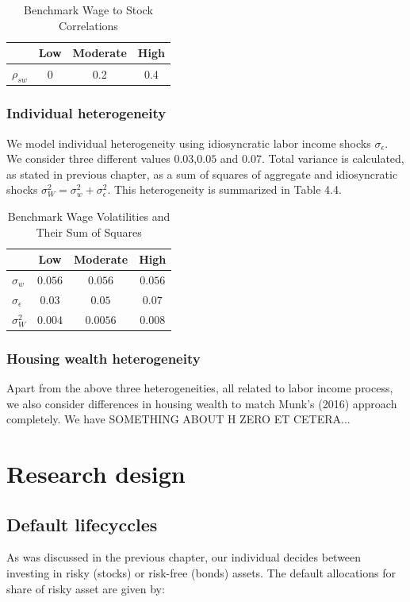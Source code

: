 \begin{table}
	\centering
	\caption{Benchmark Wage to Stock Correlations}
	\begin{tabular}[c]{c|ccc}
		&Low&Moderate&High\\
		\hline
		$\rho_{sw}$&0&0.2&0.4
	\end{tabular}
\end{table}


\subsubsection{Individual heterogeneity}

We model individual heterogeneity using idiosyncratic labor income shocks $\sigma_{\epsilon}$. We consider three different values $0.03$,$0.05$ and $0.07$. Total variance is calculated, as stated in previous chapter, as a sum of squares of aggregate and idiosyncratic shocks $\sigma^2_W = \sigma^2_w + \sigma^2_{\epsilon}$. This heterogeneity is summarized in Table 4.4. 


\begin{table}
	\centering
	\caption{Benchmark Wage Volatilities and Their Sum of Squares}
	\begin{tabular}[c]{l|ccc}
		&Low&Moderate&High\\
		\hline
		$\sigma_w$&$0.056$&$0.056$&$0.056$\\
		$\sigma_{\epsilon}$&$0.03$&$0.05$&$0.07$\\
		\hline
		$\sigma^2_{W}$&$0.004$&$0.0056$&$0.008$
	\end{tabular}
\end{table}


\subsubsection{Housing wealth heterogeneity}

Apart from the above three heterogeneities, all related to labor income process, we also consider differences in housing wealth to match Munk's (2016) approach completely. We have SOMETHING ABOUT H ZERO ET CETERA...


\section{Research design}
\subsection{Default lifecyccles}
As was discussed in the previous chapter, our individual decides between investing in risky (stocks) or risk-free (bonds) assets. The default allocations for share of risky asset are given by:

